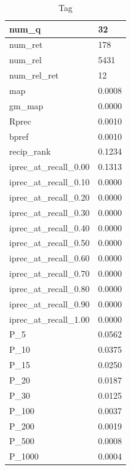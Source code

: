 \begin{table}[htb]
{\begin{tabular}{ | l | l | }
	num\_q & 32 \\ \hline
	num\_ret & 178 \\ \hline
	num\_rel & 5431 \\ \hline
	num\_rel\_ret & 12 \\ \hline
	map & 0.0008 \\ \hline
	gm\_map & 0.0000 \\ \hline
	Rprec & 0.0010 \\ \hline
	bpref & 0.0010 \\ \hline
	recip\_rank & 0.1234 \\ \hline
	iprec\_at\_recall\_0.00 & 0.1313 \\ \hline
	iprec\_at\_recall\_0.10 & 0.0000 \\ \hline
	iprec\_at\_recall\_0.20 & 0.0000 \\ \hline
	iprec\_at\_recall\_0.30 & 0.0000 \\ \hline
	iprec\_at\_recall\_0.40 & 0.0000 \\ \hline
	iprec\_at\_recall\_0.50 & 0.0000 \\ \hline
	iprec\_at\_recall\_0.60 & 0.0000 \\ \hline
	iprec\_at\_recall\_0.70 & 0.0000 \\ \hline
	iprec\_at\_recall\_0.80 & 0.0000 \\ \hline
	iprec\_at\_recall\_0.90 & 0.0000 \\ \hline
	iprec\_at\_recall\_1.00 & 0.0000 \\ \hline
	P\_5 & 0.0562 \\ \hline
	P\_10 & 0.0375 \\ \hline
	P\_15 & 0.0250 \\ \hline
	P\_20 & 0.0187 \\ \hline
	P\_30 & 0.0125 \\ \hline
	P\_100 & 0.0037 \\ \hline
	P\_200 & 0.0019 \\ \hline
	P\_500 & 0.0008 \\ \hline
	P\_1000 & 0.0004 \\ \hline
    \end{tabular}
    \caption{Tag}
    }
\end{table}


